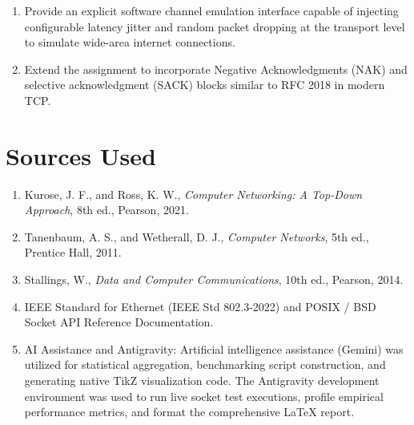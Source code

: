 \documentclass[11pt,a4paper]{article}
\begin{document}
\begin{enumerate}
    \item Provide an explicit software channel emulation interface capable of injecting configurable latency jitter and random packet dropping at the transport level to simulate wide-area internet connections.
    \item Extend the assignment to incorporate Negative Acknowledgments (NAK) and selective acknowledgment (SACK) blocks similar to RFC 2018 in modern TCP.
\end{enumerate}

\section{Sources Used}

\begin{enumerate}
    \item Kurose, J. F., and Ross, K. W., \textit{Computer Networking: A Top-Down Approach}, 8th ed., Pearson, 2021.
    \item Tanenbaum, A. S., and Wetherall, D. J., \textit{Computer Networks}, 5th ed., Prentice Hall, 2011.
    \item Stallings, W., \textit{Data and Computer Communications}, 10th ed., Pearson, 2014.
    \item IEEE Standard for Ethernet (IEEE Std 802.3-2022) and POSIX / BSD Socket API Reference Documentation.
    \item AI Assistance and Antigravity: Artificial intelligence assistance (Gemini) was utilized for statistical aggregation, benchmarking script construction, and generating native TikZ visualization code. The Antigravity development environment was used to run live socket test executions, profile empirical performance metrics, and format the comprehensive \LaTeX{} report.
\end{enumerate}
\end{document}
